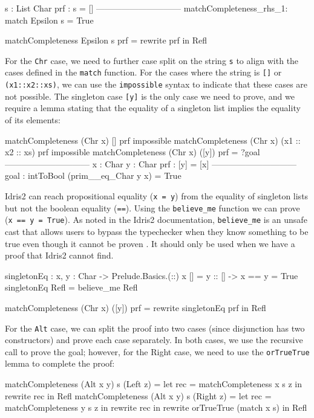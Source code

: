 \documentclass[]{rptuseminar}
\begin{document}
\begin{idris}
s : List Char
prf : s = []
------------------------------
matchCompleteness_rhs_1: match Epsilon s = True

matchCompleteness Epsilon s prf = rewrite prf in Refl
\end{idris}

For the \texttt{Chr} case, we need to further case split on the string \texttt{s} to align with the cases defined in the \texttt{match} function. For the cases where the string is \texttt{[]} or \texttt{(x1::x2::xs)}, we can use the \texttt{impossible} syntax to indicate that these cases are not possible. The singleton case \texttt{[y]} is the only case we need to prove, and we require a lemma stating that the equality of a singleton list implies the equality of its elements:

\begin{idris}
matchCompleteness (Chr x) [] prf impossible 
matchCompleteness (Chr x) (x1 :: x2 :: xs) prf impossible 
matchCompleteness (Chr x) ([y]) prf = ?goal
------------------------------
x : Char
y : Char
prf : [y] = [x]
------------------------------
goal : intToBool (prim__eq_Char y x) = True
\end{idris}

Idris2 can reach propositional equality (\texttt{x = y}) from the equality of singleton lists but not the boolean equality (\texttt{==}).
Using the \texttt{believe\_me} function we can prove (\texttt{x == y = True}). As noted in the Idris2 documentation, \texttt{believe\_me} is an unsafe cast that allows users to bypass the typechecker when they know something to be true even though it cannot be proven \cite{idris2-believeme}. It should only be used when we have a proof that Idris2 cannot find.

\begin{idris}
singletonEq : {x, y : Char} -> Prelude.Basics.(::) x [] = y :: [] -> x == y = True
singletonEq Refl = believe_me Refl 

matchCompleteness (Chr x) ([y]) prf = rewrite singletonEq prf in Refl
\end{idris}

For the \texttt{Alt} case, we can split the proof into two cases (since disjunction has two constructors) and prove each case separately. In both cases, we use the recursive call to prove the goal; however, for the Right case, we need to use the \texttt{orTrueTrue} lemma to complete the proof:

\begin{idris}
matchCompleteness (Alt x y) s (Left z) = let rec = matchCompleteness x s z in 
    rewrite rec in Refl 
matchCompleteness (Alt x y) s (Right z) = let rec = matchCompleteness y s z in 
    rewrite rec in rewrite orTrueTrue (match x s) in Refl 
\end{idris}
\end{document}
